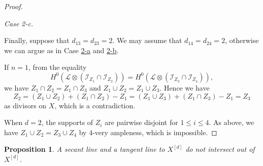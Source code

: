 \documentclass[a4paper]{amsart}
\numberwithin{equation}{section}
\theoremstyle{plain}
\newtheorem{prop}[thm]{Proposition}
\theoremstyle{definition}
\theoremstyle{remark}
\numberwithin{figure}{section}
\numberwithin{table}{section}
\numberwithin{equation}{section}
\def \Ical {\mathcal{I}}
\def \Lcal {\mathcal{L}}
\begin{document}
\begin{proof}
\hypertarget{Case1-2-c}{\textit{Case 2-c.}} Finally, suppose that $d_{13} = d_{23} = 2$.
We may assume that $d_{14} = d_{24} = 2$, otherwise we can argue as in Case \hyperlink{Case1-2-a}{2-a} and \hyperlink{Case1-2-b}{2-b}.

If $n=1$, from the equality
 \[
  H^0(\Lcal \otimes (\Ical_{Z_1} \cap \Ical_{Z_2})) = H^0(\Lcal \otimes (\Ical_{Z_3} \cap \Ical_{Z_4})),
 \]
we have $Z_1 \cap Z_2 = Z_1 \cap Z_3$ and $Z_1 \cup Z_2 = Z_1 \cup Z_3$.
Hence we have
 \[
  Z_2 = (Z_1 \cup Z_2) + (Z_1 \cap Z_2) - Z_1 = (Z_1 \cup Z_3) + (Z_1 \cap Z_3) - Z_1 = Z_3
 \]
as divisors on $X$, which is a contradiction.

When $d = 2$, the supports of $Z_i$ are pairwise disjoint for $1 \leq i \leq 4$.
As above, we have $Z_1 \cup Z_2 = Z_3 \cup Z_4$ by $4$-very ampleness, which is impossible.
\end{proof}

\begin{prop} \label{prop:Secant-line-and-tangent-line-intersect}
    A secant line and a tangent line to $X^{[d]}$ do not intersect out of $X^{[d]}$.
\end{prop}
\end{document}
